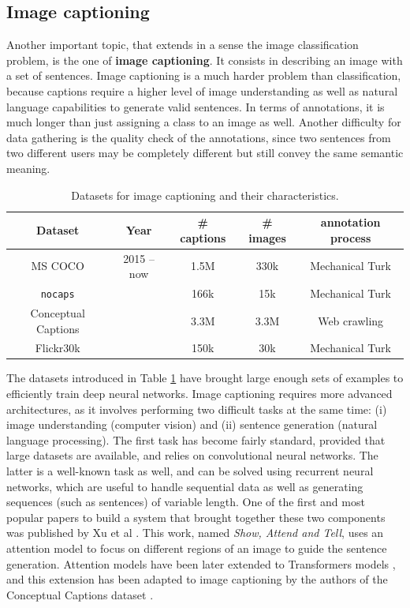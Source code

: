 \subsection{Image captioning}

Another important topic, that extends in a sense the image classification problem, is the one of \textbf{image captioning}. It consists in describing an image with a set of sentences. Image captioning is a much harder problem than classification, because captions require a higher level of image understanding as well as natural language capabilities to generate valid sentences. In terms of annotations, it is much longer than just assigning a class to an image as well. Another difficulty for data gathering is the quality check of the annotations, since two sentences from two different users may be completely different but still convey the same semantic meaning. 

\vspace{0.5cm}

\begin{table}
	\centering
	\caption{Datasets for image captioning and their characteristics.}
	\begin{tabular}{|c|c|c|c|c|}
		\hline
		Dataset & Year & \# captions & \# images & annotation process \\
		\hline
		MS COCO \cite{chen2015microsoft} & 2015 -- now & 1.5M & 330k & Mechanical Turk \\
		\texttt{nocaps} \cite{agrawal2019nocaps} & &  166k & 15k & Mechanical Turk \\
		Conceptual Captions \cite{sharma-etal-2018-conceptual} & & 3.3M & 3.3M & Web crawling \\
		Flickr30k \cite{flickr30k} & & 150k & 30k & Mechanical Turk \\
		\hline
	\end{tabular}
	\label{tab:caption_ds}
\end{table}
\vspace{0.5cm}

The datasets introduced in Table \ref{tab:caption_ds} have brought large enough sets of examples to efficiently train deep neural networks. Image captioning requires more advanced architectures, as it involves performing two difficult tasks at the same time: (i) image understanding (computer vision) and (ii) sentence generation (natural language processing). The first task has become fairly standard, provided that large datasets are available, and relies on convolutional neural networks. The latter is a well-known task as well, and can be solved using recurrent neural networks, which are useful to handle sequential data as well as generating sequences (such as sentences) of variable length. One of the first and most popular papers to build a system that brought together these two components was published by Xu et al \cite{xu2015show}. This work, named \textit{Show, Attend and Tell}, uses an attention model to focus on different regions of an image to guide the sentence generation. Attention models have been later extended to Transformers models \cite{vaswani2017attention}, and this extension has been adapted to image captioning by the authors of the Conceptual Captions dataset \cite{sharma-etal-2018-conceptual}.

